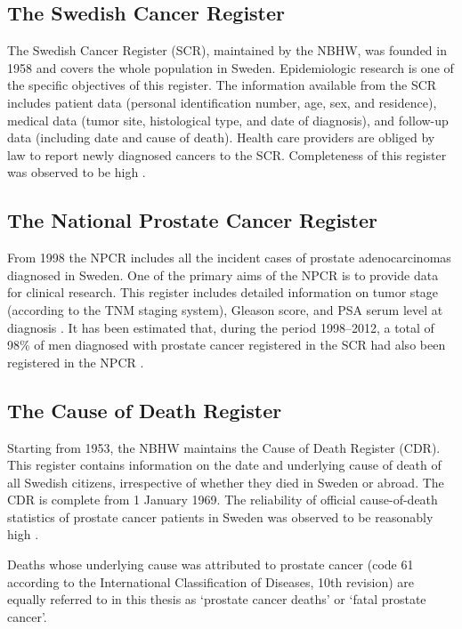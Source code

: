 \subsection{The Swedish Cancer Register}

The Swedish Cancer Register (SCR), maintained by the NBHW, was founded in 1958 and covers the whole population in Sweden. Epidemiologic research is one of the specific objectives of this register. The information available from the SCR includes patient data (personal identification number, age, sex, and residence), medical data (tumor site, histological type, and date of diagnosis), and follow-up data (including date and cause of death). Health care providers are obliged by law to report newly diagnosed cancers to the SCR. Completeness of this register was observed to be high \citep{barlow_completeness_2009}.


\subsection{The National Prostate Cancer Register}

From 1998 the NPCR includes all the incident cases of prostate adenocarcinomas diagnosed in Sweden. One of the primary aims of the NPCR is to provide data for clinical research. This register includes detailed information on tumor stage (according to the TNM staging system), Gleason score, and PSA serum level at diagnosis \citep{vanhemelrijck_cohort_2013}. It has been estimated that, during the period 1998--2012, a total of 98\% of men diagnosed with prostate cancer  registered in the SCR had also been registered in the NPCR  \citep{tomic_evaluation_2015}.

\subsection{The Cause of Death Register}

Starting from 1953, the NBHW maintains the Cause of Death Register (CDR). This register contains information on the date and underlying cause of death of all Swedish citizens, irrespective of whether they died in Sweden or abroad. The CDR is complete from 1 January 1969. The reliability of official cause-of-death statistics of prostate cancer patients in Sweden was observed to be reasonably high \citep{fall_reliability_2008, godtman_high_2011}. 

Deaths whose underlying cause was attributed to prostate cancer (code 61 according to the International Classification of Diseases, 10th revision) are equally referred to in this thesis  as `prostate cancer deaths' or `fatal prostate cancer'. 
